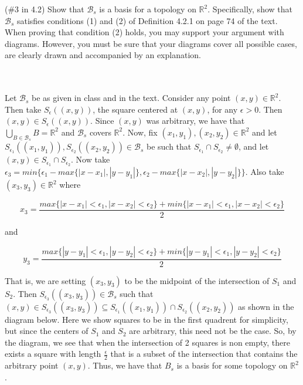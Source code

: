 (\#3 in 4.2) Show that $\mathcal{B}_s$ is a basis for a topology on $\mathbb{R}^2$. Specifically, show
that $\mathcal{B}_s$ satisfies conditions (1) and (2) of Definition 4.2.1 on page 74 of the text. When
proving that condition (2) holds, you may support your argument with diagrams. However, you must be
sure that your diagrams cover all possible cases, are clearly drawn and accompanied by an
explanation.\\\\


\begin{solution}\renewcommand{\qedsymbol}{}\ \\
    Let $\mathcal{B}_s$ be as given in class and in the text. Consider any point $(x,y)\in\mathbb{R}^2$.
    Then take $S_{\epsilon}((x,y))$, the square centered at $(x,y)$, for any $\epsilon>0$. Then
    $(x,y)\in S_{\epsilon}((x,y))$. Since $(x,y)$ was arbitrary, we have that
    $\bigcup_{B\in\mathcal{B}_s}B=\mathbb{R}^2$ and $\mathcal{B}_s$ covers $\mathbb{R}^2$. Now, fix
    $(x_1,y_1), (x_2,y_2)\in\mathbb{R}^2$ and let
    $S_{\epsilon_1}((x_1,y_1)), S_{\epsilon_2}((x_2,y_2))\in\mathcal{B}_s$ be such that
    $S_{\epsilon_1}\cap S_{\epsilon_2}\neq\emptyset$, and let
    $(x,y)\in S_{\epsilon_1}\cap S_{\epsilon_2}$. Now take
    $\epsilon_3=min\{\epsilon_1-max\{|x-x_1|,|y-y_1|\}, \epsilon_2-max\{|x-x_2|, |y-y_2|\}\}$. Also take
    $(x_3,y_3)\in\mathbb{R}^2$ where
    
    $$x_3=\frac{max\{|x-x_1|<\epsilon_1, |x-x_2|<\epsilon_2\}
    +min\{|x-x_1|<\epsilon_1, |x-x_2|<\epsilon_2\}}{2}$$
    
    and
    
    $$y_3=\frac{max\{|y-y_1|<\epsilon_1, |y-y_2|<\epsilon_2\}
    +min\{|y-y_1|<\epsilon_1, |y-y_2|<\epsilon_2\}}{2}$$
    
    That is, we are setting $(x_3,y_3)$ to be the midpoint of the intersection of $S_1$ and $S_2$. Then
    $S_{\epsilon_3}((x_3,y_3))\in\mathcal{B}_s$ such that
    $(x,y)\in S_{\epsilon_3}((x_3,y_3))\subseteq S_{\epsilon_1}((x_1,y_1))\cap
    S_{\epsilon_2}((x_2,y_2))$
    as shown in the diagram below. Here we show squares to be in the first quadrent for simplicity, but
    since the centers of $S_1$ and $S_2$ are arbitrary, this need not be the case. So, by the diagram,
    we see that when the intersection of 2 squares is non empty, there exists a square with length
    $\frac{\epsilon}{2}$ that is a subset of the intersection that contains the arbitrary point $(x,y)$.
    Thus, we have that $B_s$ is a basis for some topology on $\mathbb{R}^2$.


\end{solution}
